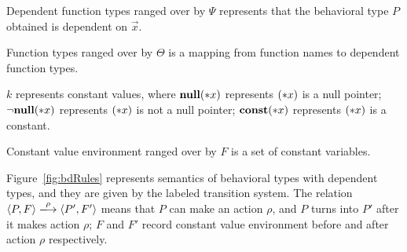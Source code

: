 Dependent function types ranged over by \(\Psi\) represents that the
behavioral type \(P\) obtained is dependent on \(\vec{x}\).

Function types ranged over by \(\Theta\) is a mapping from function names to dependent function types.

\(k\) represents constant values, where \({\bf null}(*x)\) represents
\((*x)\) is a null pointer; \(\neg{\bf null}(*x)\) represents \((*x)\) is not a
null pointer; \(\mathbf{const}(*x)\) represents \((*x)\) is a constant.

Constant value environment ranged over by \(F\) is a set of constant
variables.

Figure~\ref{fig:bdRules} represents semantics of behavioral types with
dependent types, and they are given by the labeled transition
system. The relation \( \langle P, F \rangle \xlongrightarrow{\rho}
\langle P', F' \rangle \) means that \(P\) can make an action
\(\rho\), and \(P\) turns into \(P'\) after it makes action \(\rho\);
\(F\) and \(F'\) record constant value environment before and after
action \(\rho\) respectively.

